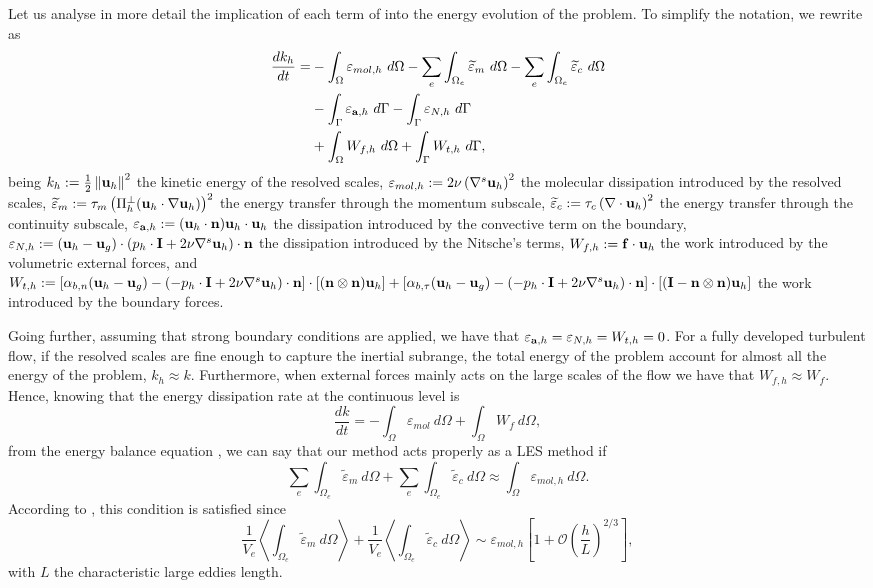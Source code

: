 Let us analyse in more detail the implication of each term of  into the energy evolution of the problem. To simplify the notation, we rewrite  as
\begin{align}
\label{NS_ene_balance_3}
\frac{dk_h}{dt}=&-\int_{\Omega}\varepsilon_{mol,h}\ d\Omega-\sum_e\int_{\Omega_e}\widetilde{\varepsilon}_m\ d\Omega-\sum_e\int_{\Omega_e}\widetilde{\varepsilon}_c\ d\Omega\\\nonumber
&-\int_{\Gamma}\varepsilon_{\a,h}\ d\Gamma-\int_{\Gamma}\varepsilon_{N,h}\ d\Gamma\\\nonumber
&+\int_{\Omega}W_{f,h}\ d\Omega+\int_{\Gamma}W_{t,h}\ d\Gamma,
\end{align}
being $ k_h:=\frac{1}{2}\left\|{\bf u}_h\right\|^2 $ the kinetic energy of the resolved scales, $ \varepsilon_{mol,h}:=2\nu\left(\nabla^s{\bf u}_h\right)^2 $ the molecular dissipation introduced by the resolved scales, $ \widetilde{\varepsilon}_m:=\tau_m\left(\Pi_h^\perp({\bf u}_h\cdot\nabla{\bf u}_h)\right)^2 $ the energy transfer through the momentum subscale, $ \widetilde{\varepsilon}_c:=\tau_c\left(\nabla\cdot{\bf u}_h\right)^2 $ the energy transfer through the continuity subscale, $ \varepsilon_{{\bf a},h}:=({\bf u}_h\cdot{\bf n}){\bf u}_h\cdot{\bf u}_h $ the dissipation introduced by the convective term on the boundary, $ \varepsilon_{N,h}:=({\bf u}_h-{\bf u}_g)\cdot(p_h\cdot\mathbf{I}+2\nu\nabla^s{\bf u}_h)\cdot{\bf n} $ the dissipation introduced by the Nitsche's terms, $ W_{f,h}:={\bf f}\cdot{\bf u}_h $ the work introduced by the volumetric external forces, and $ W_{t,h}:=\left[\alpha_{b,n}({\bf u}_h-{\bf u}_g)-(-p_h\cdot\mathbf{I}+2\nu\nabla^s{\bf u}_h)\cdot{\bf n}\right]\cdot\left[({\bf n}\otimes{\bf n}){\bf u}_h\right]+\left[\alpha_{b,\tau}({\bf u}_h-{\bf u}_g)-(-p_h\cdot\mathbf{I}+2\nu\nabla^s{\bf u}_h)\cdot{\bf n}\right]\cdot\left[(\mathbf{I}-{\bf n}\otimes{\bf n}){\bf u}_h\right] $ the work introduced by the boundary forces.

Going further, assuming that strong boundary conditions are applied, we have that $ \varepsilon_{{\bf a},h}=\varepsilon_{N,h}=W_{t,h}=0 $. For a fully developed turbulent flow, if the resolved scales are fine enough to capture the inertial subrange, the total energy of the problem account for almost all the energy of the problem, $ k_h\approx k $. Furthermore, when external forces mainly acts on the large scales of the flow we have that $ W_{f,h}\approx W_f $. Hence, knowing that the energy dissipation rate at the continuous level is
$$ \frac{dk}{dt}=-\int_{\Omega}\varepsilon_{mol}\ d\Omega+\int_{\Omega}W_{f}\ d\Omega, $$
from the energy balance equation , we can say that our method acts properly as a LES method if
$$ \sum_e\int_{\Omega_e}\widetilde{\varepsilon}_m\ d\Omega+\sum_e\int_{\Omega_e}\widetilde{\varepsilon}_c\ d\Omega\approx\int_{\Omega}\varepsilon_{mol,h}\ d\Omega. $$
According to \cite{guasch_statistical}, this condition is satisfied since 
$$ \frac{1}{V_e}\left\langle\int_{\Omega_e}\widetilde{\varepsilon}_m\ d\Omega\right\rangle + \frac{1}{V_e}\left\langle\int_{\Omega_e}\widetilde{\varepsilon}_c\ d\Omega\right\rangle\sim\varepsilon_{mol,h}\left[1+\mathcal{O}\left(\frac{h}{L}\right)^{2/3}\right], $$
with $ L $ the characteristic large eddies length.

